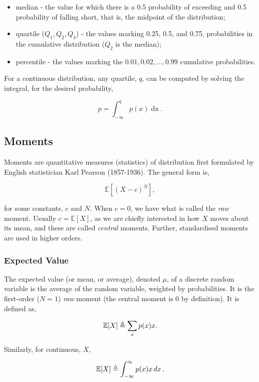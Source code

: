 \documentclass[11pt]{amsart}
\begin{document}
\begin{itemize}
\item median - the value for which there is a 0.5 probability of exceeding and 0.5 probability of falling short, that is, the midpoint of the distribution;
\item quartile ($Q_1, Q_2, Q_3$) - the values marking 0.25, 0.5, and 0.75, probabilities in the cumulative distribution ($Q_2$ is the median);
\item percentile - the values marking the $0.01, 0.02, \dots, 0.99$ cumulative probabilities.
\end{itemize}

For a continuous distribution, any quartile, $q$, can be computed by solving the integral, for the desired probability,

$$
p = \int_{-\infty}^{q} p(x) \mathop{dx}.
$$


\subsection{Moments}

Moments are quantitative measures (statistics) of distribution first formulated by English statistician Karl Pearson (1857-1936). The general form is,

$$
\mathbb{E}[(X - c)^N],
$$

for some constants, $c$ and $N$. When $c = 0$, we have what is called the \emph{raw} moment. Usually $c = \mathbb{E}[X]$, as we are chiefly interested in how $X$ moves about its mean, and these are called \emph{central} moments. Further, standardised moments are used in higher orders.

\subsubsection{Expected Value}

The expected value (or mean, or average), denoted $\mu$, of a discrete random variable is the average of the random variable, weighted by probabilities. It is the first-order ($N=1$) \emph{raw} moment (the central moment is 0 by definition). It is defined as,

$$
\mathbb{E}[X] \triangleq \sum_{x} p(x) x.\\
$$

Similarly, for continuous, $X$,

$$
\mathbb{E}[X] \triangleq \int_{-\infty}^{\infty} p(x) x \mathop{dx}.\\
$$ 
\end{document}
